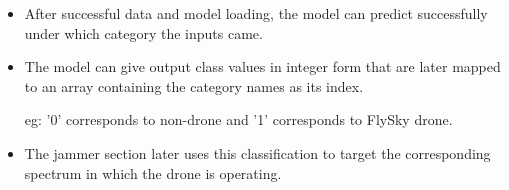 \begin{itemize}
\item After successful data and model loading, the model can predict successfully under which category the inputs came.

\item The model can give output class values in integer form that are later mapped to an array containing the category names as its index.

eg: '0' corresponds to non-drone and '1' corresponds to FlySky drone.

\item The jammer section later uses this classification to target the corresponding spectrum in which the drone is operating.
\end{itemize}


